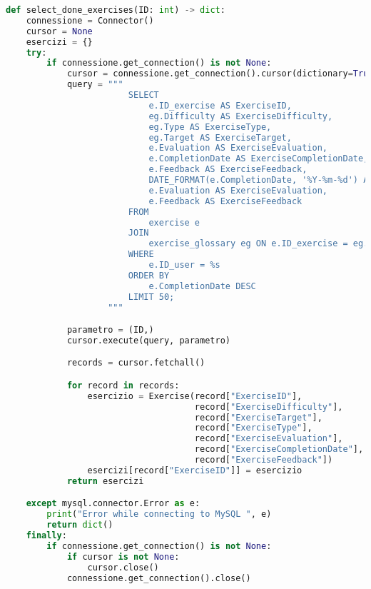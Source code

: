 \documentclass{article}
\begin{document}
\begin{lstlisting}[language=Python, breaklines, no caption]
def select_done_exercises(ID: int) -> dict:
    connessione = Connector()
    cursor = None
    esercizi = {}
    try:
        if connessione.get_connection() is not None:
            cursor = connessione.get_connection().cursor(dictionary=True)
            query = """
                        SELECT
                            e.ID_exercise AS ExerciseID,
                            eg.Difficulty AS ExerciseDifficulty,
                            eg.Type AS ExerciseType,
                            eg.Target AS ExerciseTarget,
                            e.Evaluation AS ExerciseEvaluation,
                            e.CompletionDate AS ExerciseCompletionDate,
                            e.Feedback AS ExerciseFeedback,
                            DATE_FORMAT(e.CompletionDate, '%Y-%m-%d') AS ExerciseCompletionDate,
                            e.Evaluation AS ExerciseEvaluation,
                            e.Feedback AS ExerciseFeedback
                        FROM
                            exercise e
                        JOIN
                            exercise_glossary eg ON e.ID_exercise = eg.ID_exercise
                        WHERE
                            e.ID_user = %s
                        ORDER BY
                            e.CompletionDate DESC
                        LIMIT 50;
                    """

            parametro = (ID,)
            cursor.execute(query, parametro)

            records = cursor.fetchall()

            for record in records:
                esercizio = Exercise(record["ExerciseID"],
                                     record["ExerciseDifficulty"],
                                     record["ExerciseTarget"],
                                     record["ExerciseType"],
                                     record["ExerciseEvaluation"],
                                     record["ExerciseCompletionDate"],
                                     record["ExerciseFeedback"])
                esercizi[record["ExerciseID"]] = esercizio
            return esercizi

    except mysql.connector.Error as e:
        print("Error while connecting to MySQL ", e)
        return dict()
    finally:
        if connessione.get_connection() is not None:
            if cursor is not None:
                cursor.close()
            connessione.get_connection().close()
\end{lstlisting}
\end{document}
